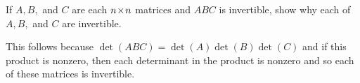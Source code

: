 
\begin{Exercise}[
name={},
title={}, 
difficulty=0,
origin={\cite{KK}}]
If $A,B,$ and $C$ are each $n \! \times \! n$ matrices and $ABC$ is
invertible, show why each of $A,B,$ and $C$ are invertible.
\end{Exercise}

\begin{Answer}
This follows
because $\det \left( ABC\right) =\det \left( A\right) \det \left( B\right)
\det \left( C\right) $ and if this product is nonzero, then each determinant
in the product is nonzero and so each of these matrices is invertible.
\end{Answer}
